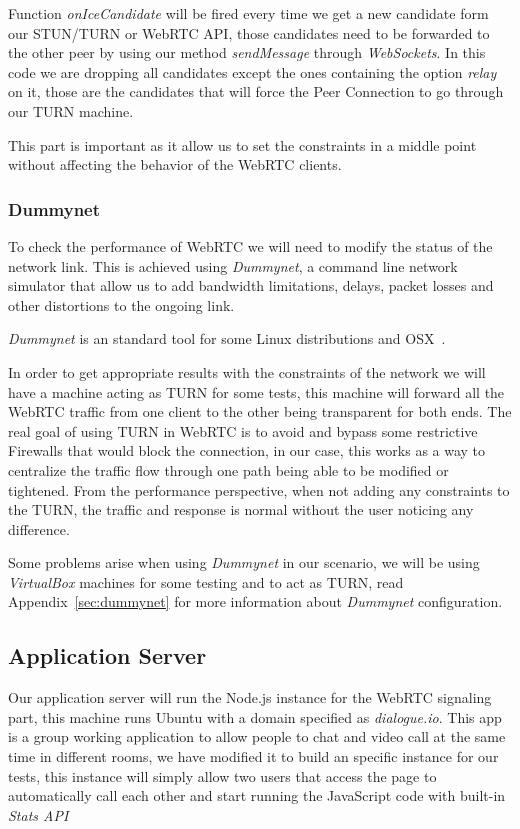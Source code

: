 Function {\it onIceCandidate} will be fired every time we get a new candidate form our STUN/TURN or WebRTC API, those candidates need to be forwarded to the other peer by using our method {\it sendMessage} through {\it WebSockets}. In this code we are dropping all candidates except the ones containing the option {\it relay} on it, those are the candidates that will force the Peer Connection to go through our TURN machine.

This part is important as it allow us to set the constraints in a middle point without affecting the behavior of the WebRTC clients.

\subsubsection{Dummynet}

To check the performance of WebRTC we will need to modify the status of the network link. This is achieved using {\it Dummynet}, a command line network simulator that allow us to add bandwidth limitations, delays, packet losses and other distortions to the ongoing link.

{\it Dummynet} is an standard tool for some Linux distributions and OSX~\cite{dummynetTool}.

In order to get appropriate results with the constraints of the network we will have a machine acting as TURN for some tests, this machine will forward all the WebRTC traffic from one client to the other being transparent for both ends. The real goal of using TURN in WebRTC is to avoid and bypass some restrictive Firewalls that would block the connection, in our case, this works as a way to centralize the traffic flow through one path being able to be modified or tightened. From the performance perspective, when not adding any constraints to the TURN, the traffic and response is normal without the user noticing any difference.

Some problems arise when using {\it Dummynet} in our scenario, we will be using {\it VirtualBox} machines for some testing and to act as TURN, read Appendix~\ref{sec:dummynet} for more information about {\it Dummynet} configuration.

\subsection{Application Server}

Our application server will run the Node.js instance for the WebRTC signaling part, this machine runs Ubuntu with a domain specified as {\it dialogue.io}. This app is a group working application to allow people to chat and video call at the same time in different rooms, we have modified it to build an specific instance for our tests, this instance will simply allow two users that access the page to automatically call each other and start running the JavaScript code with built-in {\it Stats API}

